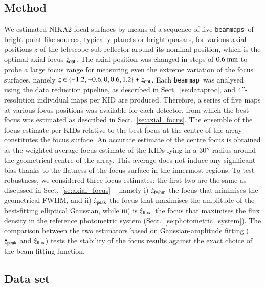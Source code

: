 \documentclass[traditionalabstract]{aa}
\newcommand{\bm}{{\tt beammap}}
\newcommand{\bms}{{\tt beammaps}}
\begin{document}
{\begin{appendix}
\subsection{Method}

We estimated NIKA2 focal surfaces by means of a sequence of five \bms\ of bright
point-like sources, typically planets or bright quasars, for various
axial positions $z$ of the telescope sub-reflector around its nominal
position, which is the optimal axial focus $z_{\rm{opt}}$. 
The axial position was changed in steps of $0.6~\rm{mm}$ to probe a large
focus range for measuring even the extreme variation of the focus surfaces,
namely $z \in \{-1.2, -0.6, 0, 0.6, 1.2 \} + z_{\rm{opt}}$.  Each
\bm\ was analysed using the data reduction pipeline, as described in
Sect.~\ref{se:dataproc}, and $4''$-resolution individual maps per KID
are produced. 
Therefore, a series of
five maps at various focus positions was available for each detector, from which
the best focus was estimated as described in Sect.~\ref{se:axial_focus}. The
ensemble of the focus estimate per KIDs relative to the best focus
at the centre of the array constitutes the focus surface. An accurate estimate
of the centre focus is obtained as the weighted-average focus estimate of the
KIDs lying in a $30''$ radius around the geometrical centre of the array. This
average does not induce any significant bias thanks to the flatness of the focus
surface in the innermost regions. To test robustness, we considered three focus
estimates: the first two are the same as discussed in
Sect.~\ref{se:axial_focus} -- namely i) $\hat z_{\rm{fwhm}}$ the focus that
minimises the geometrical FWHM, and ii) $\hat z_{\rm{peak}}$ the focus that
maximises the amplitude of the best-fitting elliptical Gaussian, while iii) is $\hat z_{\rm{flux,}}$ the focus that maximises the flux
density in the reference photometric system
(Sect.~\ref{se:photometric_system}). The comparison between the two
estimators based on Gaussian-amplitude fitting ($\hat z_{\rm{peak}}$
and $\hat z_{\rm{flux}}$) tests the stability of the focus
results against the exact choice of the beam fitting function.

\subsection{Data set}


\end{appendix}}
\end{document}
